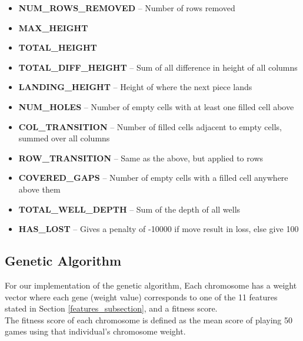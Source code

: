 \documentclass[a4paper,12pt,twocolumn]{article}
\begin{document}
\begin{itemize}
    \item \textbf{NUM\_ROWS\_REMOVED} -- Number of rows removed
    \item \textbf{MAX\_HEIGHT}
    \item \textbf{TOTAL\_HEIGHT}
    \item \textbf{TOTAL\_DIFF\_HEIGHT} -- Sum of all difference in height of all columns
    \item \textbf{LANDING\_HEIGHT} -- Height of where the next piece lands
    \item \textbf{NUM\_HOLES} -- Number of empty cells with at least one filled cell above
    \item \textbf{COL\_TRANSITION} -- Number of filled cells adjacent to empty cells,
        summed over all columns
    \item \textbf{ROW\_TRANSITION} -- Same as the above, but applied to rows
    \item \textbf{COVERED\_GAPS} -- Number of empty cells with a filled cell
        anywhere above them
    \item \textbf{TOTAL\_WELL\_DEPTH} -- Sum of the depth of all wells
    \item \textbf{HAS\_LOST} -- Gives a penalty of -10000 if move result in loss,
        else give 100
\end{itemize}

\subsection{Genetic Algorithm}
For our implementation of the genetic algorithm, Each chromosome has a weight
vector where each gene (weight value) corresponds to one of the 11 features
stated in Section \ref{features_subsection}, and a fitness score.\\


The fitness score of each chromosome is defined as the mean score of playing 50
games using that individual's chromosome weight.\\
\end{document}
